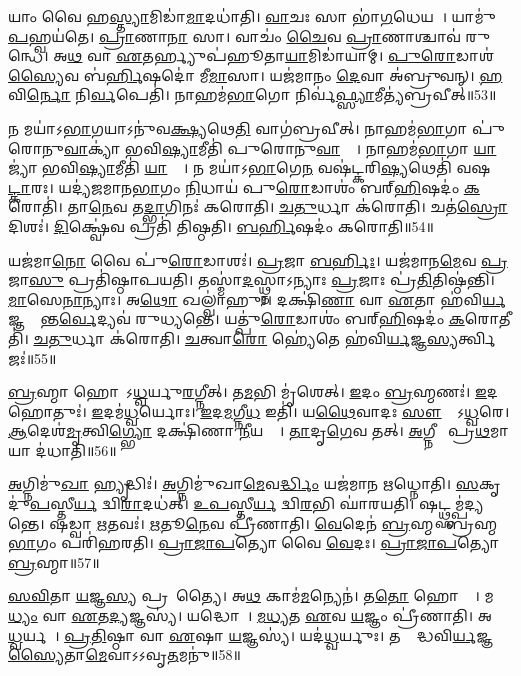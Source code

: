 𑌯𑌾𑌂 𑌵𑍈 𑌹\ul{𑌸𑍍𑌤𑍍𑌯𑌾}𑌮𑌿𑌡𑌾॑\ul{𑌮𑌾}𑌦𑌧𑌾॑𑌤𑌿।
\ul{𑌵𑌾}𑌚𑌃 𑌸𑌾 𑌭𑌾॑\ul{𑌗}𑌧𑍇𑌯𑌮𑍍᳚।
𑌯𑌾𑌮𑍁॑\ul{𑌪}𑌹𑍍𑌵𑌯॑𑌤𑍇।
\ul{𑌪𑍍𑌰𑌾}𑌣𑌾\ul{𑌨𑌾}\ul{} 𑌸𑌾।
𑌵𑌾𑌚𑌂॑ \ul{𑌚𑍈}𑌵 \ul{𑌪𑍍𑌰𑌾}𑌣𑌾𑌶𑍍𑌚𑌾𑌵॑ 𑌰𑍁𑌨𑍍𑌧𑍇।
𑌅\ul{𑌥} 𑌵𑌾 \ul{𑌏}𑌤𑌰𑍍𑌹𑍍𑌯𑍁𑌪॑𑌹𑍂𑌤𑌾\ul{𑌯𑌾}𑌮𑌿𑌡𑌾॑𑌯𑌾𑌮𑍍।
\ul{𑌪𑍁}\ul{𑌰𑍋}𑌡𑌾𑌶॑\ul{𑌸𑍍𑌯𑍈}𑌵 𑌬॑\ul{𑌰𑍍𑌹𑌿}𑌷𑌦𑍋॑ 𑌮𑍀\ul{𑌮𑌾}\ul{}𑌸𑌾।
𑌯𑌜॑𑌮𑌾𑌨𑌂 \ul{𑌦𑍇}𑌵𑌾 𑌅॑𑌬𑍍𑌰𑍁𑌵𑌨𑍍।
\ul{𑌹}𑌵𑌿\ul{𑌰𑍍𑌨𑍋} 𑌨𑌿\ul{𑌰𑍍𑌵}𑌪𑍇𑌤𑌿॑।
𑌨𑌾𑌹𑌮॑\ul{𑌭𑌾}𑌗𑍋 𑌨𑌿𑌰𑍍𑌵॑\ul{𑌫𑍍𑌸𑍍𑌯𑌾}𑌮𑍀𑌤𑍍𑌯॑𑌬𑍍𑌰𑌵𑍀𑌤𑍍॥53॥

𑌨 𑌮𑌯𑌾॑\-𑌽\ul{𑌭𑌾}𑌗𑌯𑌾\-𑌽𑌨𑍁॑𑌵\ul{𑌕𑍍𑌷𑍍𑌯}𑌥𑍇\ul{𑌤𑌿} 𑌵𑌾𑌗॑𑌬𑍍𑌰𑌵𑍀𑌤𑍍।
𑌨𑌾𑌹𑌮॑\ul{𑌭𑌾}𑌗𑌾 𑌪𑍁॑𑌰𑍋𑌨𑍁\ul{𑌵𑌾}𑌕𑍍𑌯𑌾॑ 𑌭𑌵𑌿\ul{𑌷𑍍𑌯𑌾}𑌮𑍀𑌤𑌿॑ 𑌪𑍁𑌰𑍋𑌨𑍁\ul{𑌵𑌾}𑌕𑍍𑌯𑌾᳚।
𑌨𑌾𑌹𑌮॑\ul{𑌭𑌾}𑌗𑌾 \ul{𑌯𑌾}𑌜𑍍𑌯𑌾॑ 𑌭𑌵𑌿\ul{𑌷𑍍𑌯𑌾}𑌮𑍀𑌤𑌿॑ \ul{𑌯𑌾}𑌜𑍍𑌯𑌾᳚।
𑌨 𑌮𑌯𑌾॑\-𑌽\ul{𑌭𑌾}𑌗𑍇\ul{𑌨} 𑌵𑌷॑𑌟𑍍𑌕𑌰𑌿\ul{𑌷𑍍𑌯}𑌥𑍇𑌤𑌿॑ 𑌵𑌷\ul{𑌟𑍍𑌕𑌾}𑌰𑌃।
𑌯𑌦𑍍𑌯॑𑌜𑌮𑌾𑌨\ul{𑌭𑌾}𑌗𑌂 \ul{𑌨𑌿}𑌧𑌾𑌯॑ 𑌪𑍁\ul{𑌰𑍋}𑌡𑌾𑌶𑌂॑ 𑌬𑌰𑍍‌\mbox{}\ul{𑌹𑌿}𑌷𑌦𑌂॑ \ul{𑌕}𑌰𑍋𑌤𑌿॑।
𑌤𑌾\ul{𑌨𑍇}𑌵 𑌤\ul{𑌦𑍍𑌭𑌾}𑌗𑌿𑌨𑌃॑ 𑌕𑌰𑍋𑌤𑌿।
\ul{𑌚}\ul{𑌤𑍁}𑌰𑍍𑌧𑌾 𑌕॑𑌰𑍋𑌤𑌿।
𑌚𑌤॑\ul{𑌸𑍍𑌰𑍋} 𑌦𑌿𑌶𑌃॑।
\ul{𑌦𑌿}𑌕𑍍𑌷𑍍𑌵𑍇॑𑌵 𑌪𑍍𑌰𑌤𑌿॑ 𑌤𑌿𑌷𑍍𑌠𑌤𑌿।
\ul{𑌬}\ul{𑌰𑍍}\ul{𑌹𑌿}𑌷𑌦𑌂॑ 𑌕𑌰𑍋𑌤𑌿॥54॥

𑌯𑌜॑𑌮𑌾\ul{𑌨𑍋} 𑌵𑍈 𑌪𑍁॑\ul{𑌰𑍋}𑌡𑌾𑌶𑌃॑।
\ul{𑌪𑍍𑌰}𑌜𑌾 \ul{𑌬}\ul{𑌰𑍍}𑌹𑌿𑌃।
𑌯𑌜॑𑌮𑌾𑌨\ul{𑌮𑍇}𑌵 \ul{𑌪𑍍𑌰}𑌜𑌾\ul{𑌸𑍁} 𑌪𑍍𑌰𑌤𑌿॑\-𑌷𑍍𑌠𑌾𑌪𑌯𑌤𑌿।
𑌤𑌸𑍍𑌮𑌾॑\ul{𑌦}𑌸𑍍𑌥𑍍𑌨𑌾\-𑌽𑌨𑍍𑌯𑌾𑌃 \ul{𑌪𑍍𑌰}𑌜𑌾𑌃 𑌪𑍍𑌰॑\ul{𑌤𑌿}𑌤𑌿𑌷𑍍𑌠॑𑌨𑍍𑌤𑌿।
\ul{𑌮𑌾}\ul{}𑌸𑍇\ul{𑌨𑌾}𑌨𑍍𑌯𑌾𑌃।
𑌅\ul{𑌥𑍋} 𑌖𑌲𑍍𑌵𑌾॑𑌹𑍁𑌃।
𑌦𑌕𑍍𑌷𑌿॑\ul{𑌣𑌾} 𑌵𑌾 \ul{𑌏}𑌤𑌾 𑌹॑𑌵𑌿\ul{𑌰𑍍𑌯}𑌜𑍍𑌞𑌸𑍍𑌯𑌾᳚𑌨𑍍𑌤\ul{𑌰𑍍𑌵𑍇}𑌦𑍍𑌯𑌵॑ 𑌰𑍁𑌧𑍍𑌯𑌨𑍍𑌤𑍇।
𑌯𑌤𑍍𑌪𑍁॑\ul{𑌰𑍋}𑌡𑌾𑌶𑌂॑ 𑌬𑌰𑍍‌\mbox{}\ul{𑌹𑌿}𑌷𑌦𑌂॑ \ul{𑌕}𑌰𑍋𑌤𑍀𑌤𑌿॑।
\ul{𑌚}\ul{𑌤𑍁}𑌰𑍍𑌧𑌾 𑌕॑𑌰𑍋𑌤𑌿।
\ul{𑌚}𑌤𑍍𑌵𑌾\ul{𑌰𑍋} 𑌹𑍍𑌯𑍇॑𑌤𑍇 𑌹॑𑌵𑌿\ul{𑌰𑍍𑌯}𑌜𑍍𑌞\ul{𑌸𑍍𑌯}𑌰𑍍𑌤𑍍𑌵𑌿𑌜𑌃॑॥55॥

\ul{𑌬𑍍𑌰}𑌹𑍍𑌮𑌾 𑌹𑍋𑌤𑌾᳚\-𑌽\ul{𑌧𑍍𑌵}𑌰𑍍𑌯𑍁\ul{𑌰}𑌗𑍍𑌨𑍀𑌤𑍍।
𑌤\ul{𑌮}𑌭𑌿 𑌮𑍃॑𑌶𑍇𑌤𑍍।
\ul{𑌇}𑌦𑌂 \ul{𑌬𑍍𑌰}𑌹𑍍𑌮𑌣𑌃॑।
\ul{𑌇}𑌦 𑌹𑍋𑌤𑍁𑌃॑।
\ul{𑌇}𑌦𑌮॑\ul{𑌧𑍍𑌵}𑌰𑍍𑌯𑍋𑌃।
\ul{𑌇}𑌦\ul{𑌮}𑌗𑍍𑌨𑍀\ul{𑌧} 𑌇𑌤𑌿॑।
𑌯\ul{𑌥𑍈}𑌵𑌾𑌦𑌃 \ul{𑌸𑍗}𑌮𑍍𑌯𑍇᳚\-𑌽\ul{𑌧𑍍𑌵}𑌰𑍇।
\ul{𑌆}𑌦𑍇𑌶॑\ul{𑌮𑍃}𑌤𑍍𑌵𑌿\ul{𑌗𑍍𑌭𑍍𑌯𑍋} 𑌦𑌕𑍍𑌷𑌿॑𑌣𑌾 \ul{𑌨𑍀}𑌯𑌨𑍍𑌤𑍇᳚।
\ul{𑌤𑌾}𑌦𑍃\ul{𑌗𑍇}𑌵 𑌤𑌤𑍍।
\ul{𑌅}𑌗𑍍𑌨𑍀𑌧𑍇᳚ 𑌪𑍍𑌰\ul{𑌥}𑌮𑌾𑌯𑌾 𑌦॑𑌧𑌾𑌤𑌿॥56॥

\ul{𑌅}𑌗𑍍𑌨𑌿𑌮𑍁॑\ul{𑌖𑌾} 𑌹𑍍𑌯𑍃𑌦𑍍𑌧𑌿𑌃॑।
\ul{𑌅}𑌗𑍍𑌨𑌿𑌮𑍁॑𑌖𑌾\ul{𑌮𑍇}𑌵\ul{𑌰𑍍𑌦𑍍𑌧𑌿𑌂} 𑌯𑌜॑𑌮𑌾𑌨 𑌋𑌧𑍍𑌨𑍋𑌤𑌿।
\ul{𑌸}𑌕𑍃𑌦𑍁॑\ul{𑌪}𑌸𑍍𑌤𑍀\ul{𑌰𑍍𑌯} 𑌦𑍍𑌵𑌿\ul{𑌰𑌾}𑌦𑌧॑𑌤𑍍।
\ul{𑌉}\ul{𑌪}𑌸𑍍𑌤𑍀\ul{𑌰𑍍𑌯} 𑌦𑍍𑌵𑌿\ul{𑌰}𑌭𑌿 𑌘𑌾॑𑌰𑌯𑌤𑌿।
𑌷𑌟𑍍𑌥𑍍𑌸𑌮𑍍𑌪॑𑌦𑍍𑌯𑌨𑍍𑌤𑍇।
𑌷𑌡𑍍𑌵𑌾 \ul{𑌋}𑌤𑌵𑌃॑।
\ul{𑌋}𑌤𑍂\ul{𑌨𑍇}𑌵 𑌪𑍍𑌰𑍀॑𑌣𑌾𑌤𑌿।
\ul{𑌵𑍇}𑌦𑍇𑌨॑ \ul{𑌬𑍍𑌰}𑌹𑍍𑌮𑌣𑍇᳚ 𑌬𑍍𑌰𑌹𑍍𑌮\ul{𑌭𑌾}𑌗𑌂 𑌪𑌰𑌿॑𑌹𑌰𑌤𑌿।
\ul{𑌪𑍍𑌰𑌾}\ul{𑌜𑌾}\ul{𑌪}𑌤𑍍𑌯𑍋 𑌵𑍈 \ul{𑌵𑍇}𑌦𑌃।
\ul{𑌪𑍍𑌰𑌾}\ul{𑌜𑌾}\ul{𑌪}𑌤𑍍𑌯𑍋 \ul{𑌬𑍍𑌰}𑌹𑍍𑌮𑌾॥57॥

\ul{𑌸}\ul{𑌵𑌿}𑌤𑌾 \ul{𑌯}𑌜𑍍𑌞\ul{𑌸𑍍𑌯} 𑌪𑍍𑌰𑌸𑍂᳚𑌤𑍍𑌯𑍈।
𑌅\ul{𑌥} 𑌕𑌾𑌮॑\ul{𑌮}𑌨𑍍𑌯𑍇𑌨॑।
𑌤\ul{𑌤𑍋} 𑌹𑍋𑌤𑍍𑌰𑍇᳚।
𑌮\ul{𑌧𑍍𑌯𑌂} 𑌵𑌾 \ul{𑌏}𑌤\ul{𑌦𑍍𑌯}𑌜𑍍𑌞𑌸𑍍𑌯॑।
𑌯𑌦𑍍𑌧𑍋𑌤𑌾᳚।
\ul{𑌮}\ul{𑌧𑍍𑌯}𑌤 \ul{𑌏}𑌵 \ul{𑌯}𑌜𑍍𑌞𑌂 𑌪𑍍𑌰𑍀॑𑌣𑌾𑌤𑌿।
𑌅𑌥𑌾᳚\ul{𑌧𑍍𑌵}𑌰𑍍𑌯𑌵𑍇᳚।
\ul{𑌪𑍍𑌰}\ul{𑌤𑌿}𑌷𑍍𑌠𑌾 𑌵𑌾 \ul{𑌏}𑌷𑌾 \ul{𑌯}𑌜𑍍𑌞𑌸𑍍𑌯॑।
𑌯𑌦॑\ul{𑌧𑍍𑌵}𑌰𑍍𑌯𑍁𑌃।
𑌤𑌸𑍍𑌮𑌾᳚𑌦𑍍𑌧𑌵𑌿\ul{𑌰𑍍𑌯}𑌜𑍍𑌞\ul{𑌸𑍍𑌯𑍈}𑌤𑌾\ul{𑌮𑍇}𑌵𑌾𑌽𑌽𑌵𑍃\ul{𑌤}𑌮𑌨𑍁॑॥58॥

